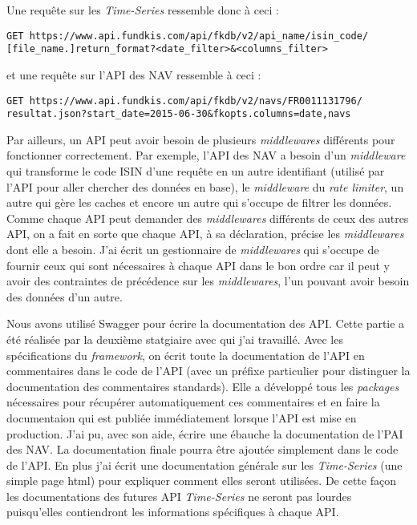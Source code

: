 \vspace{3mm}

Une requête sur les \textit{Time-Series} ressemble donc à ceci :

\vspace{3mm}

\noindent
{\color{blue}
\texttt{GET https://www.api.fundkis.com/api/fkdb/v2/{api\_name}/{isin\_code}/} \\
\texttt{[{file\_name}.]{return\_format}?<date\_filter>\&<columns\_filter>}
}

\vspace{3mm}

et une requête sur l'API des NAV ressemble à ceci :

\vspace{3mm}

\noindent
{\color{blue}
\texttt{GET https://www.api.fundkis.com/api/fkdb/v2/navs/FR0011131796/} \\
\texttt{resultat.json?start\_date=2015-06-30\&fkopts.columns=date,navs}
}


\vspace{3mm}
Par ailleurs, un API peut avoir besoin de plusieurs \textit{middlewares} différents pour fonctionner correctement. Par exemple, l'API des NAV a besoin d'un \textit{middleware} qui transforme le code ISIN d'une requête en un autre identifiant (utilisé par l'API pour aller chercher des données en base), le \textit{middleware} du \textit{rate limiter}, un autre qui gère les caches et encore un autre qui s'occupe de filtrer les données. Comme chaque API peut demander des \textit{middlewares} différents de ceux des autres API, on a fait en sorte que chaque API, à sa déclaration, précise les \textit{middlewares} dont elle a besoin. J'ai écrit un gestionnaire de \textit{middlewares} qui s'occupe de fournir ceux qui sont nécessaires à chaque API dans le bon ordre car il peut y avoir des contraintes de précédence sur les \textit{middlewares}, l'un pouvant avoir besoin des données d'un autre.

\vspace{3mm}

Nous avons utilisé Swagger pour écrire la documentation des API. Cette partie a été réalisée par la deuxième statgiaire avec qui j'ai travaillé. Avec les spécifications du \textit{framework}, on écrit toute la documentation de l'API en commentaires dans le code de l'API (avec un préfixe particulier pour distinguer la documentation des commentaires standards). Elle a développé tous les \textit{packages} nécessaires pour récupérer automatiquement ces commentaires et en faire la documentaion qui est publiée immédiatement lorsque l'API est mise en production. J'ai pu, avec son aide, écrire une ébauche la documentation de l'PAI des NAV. La documentation finale pourra être ajoutée simplement dans le code de l'API. En plus j'ai écrit une documentation générale sur les \textit{Time-Series} (une simple page html) pour expliquer comment elles seront utilisées. De cette façon les documentations des futures API \textit{Time-Series} ne seront pas lourdes puisqu'elles contiendront les informations spécifiques à chaque API.
